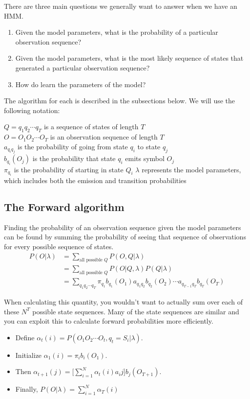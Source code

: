 \documentclass[11pt, oneside]{article}
\begin{document}
There are three main questions we generally want to answer when we have an HMM.

\begin{enumerate}
\item Given the model parameters, what is the probability of a particular observation sequence?
\item Given the model parameters, what is the most likely sequence of states that generated a particular observation sequence?
\item How do learn the parameters of the model?
\end{enumerate}

The algorithm for each is described in the subsections below. We will use the following notation:

$Q = q_1q_2\cdots q_T$ is a sequence of states of length $T$\\
$O = O_1O_2\cdots O_T$ is an observation sequence of length $T$\\
$a_{q_iq_j}$ is the probability of going from state $q_i$ to state $q_j$\\
$b_{q_i}(O_j)$ is the probability that state $q_i$ emits symbol $O_j$\\
$\pi_{q_i}$ is the probability of starting in state $Q_i$
$\lambda$ represents the model parameters, which includes both the emission and transition probabilities

\subsection{The Forward algorithm}

Finding the probability of an observation sequence given the model parameters can be found by summing the probability of seeing that sequence of observations for every possible sequence of states.
\begin{align*}
P(O|\lambda) &= \sum_{\textrm{all possible } Q} P(O,Q|\lambda)\\
&= \sum_{\textrm{all possible } Q} P(O|Q,\lambda)P(Q|\lambda)\\
&= \sum_{q_1q_2\cdots q_T}\pi_{q_1}b_{q_1}(O_1)a_{q_1q_2}b_{q_2}(O_2)\cdots 
a_{q_{T-1}q_T}b_{q_T}(O_T)
\end{align*}

When calculating this quantity, you wouldn't want to actually sum over each of these $N^T$ possible state sequences. Many of the state sequences are similar and you can exploit this to calculate forward probabilities more efficiently. 
\begin{itemize}
\item Define $\alpha_t(i) = P(O_1O_2\cdots O_t, q_t=S_i|\lambda)$.
\item Initialize $\alpha_1(i) = \pi_ib_i(O_1)$.
\item Then $\alpha_{t+1}(j) = \bigl[\sum_{i=1}^N \alpha_t(i)a_ij \bigr]b_j(O_{T+1})$.
\item Finally, $P(O|\lambda) = \sum_{i=1}^N\alpha_T(i)$
\end{itemize}
\end{document}
